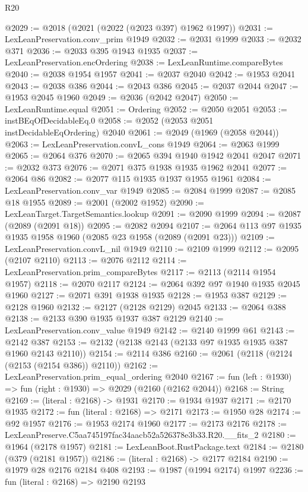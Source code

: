 \begin{lexlean}{R20}
\begin{coremodule}
@2029 := @2018 (@2021 (@2022 (@2023 @397) @1962 @1997))
@2031 := LexLeanPreservation.conv_prim @1949
@2032 := @2031 @1999
@2033 := @2032 @371
@2036 := @2033 @395 @1943 @1935
@2037 := LexLeanPreservation.encOrdering
@2038 := LexLeanRuntime.compareBytes
@2040 := @2038 @1954 @1957
@2041 := @2037 @2040
@2042 := @1953 @2041
@2043 := @2038 @386
@2044 := @2043 @386
@2045 := @2037 @2044
@2047 := @1953 @2045 @1960
@2049 := @2036 (@2042 @2047)
@2050 := LexLeanRuntime.equal
@2051 := Ordering
@2052 := @2050 @2051
@2053 := instBEqOfDecidableEq.{0}
@2058 := @2052 (@2053 @2051 instDecidableEqOrdering) @2040
@2061 := @2049 (@1969 (@2058 @2044))
@2063 := LexLeanPreservation.convL_cons @1949
@2064 := @2063 @1999
@2065 := @2064 @376
@2070 := @2065 @394 @1940 @1942 @2041 @2047
@2071 := @2032 @373
@2076 := @2071 @375 @1938 @1935 @1962 @2041
@2077 := @2064 @86
@2082 := @2077 @115 @1935 @1937 @1955 @1961
@2084 := LexLeanPreservation.conv_var @1949
@2085 := @2084 @1999
@2087 := @2085 @18 @1955
@2089 := @2001 (@2002 @1952)
@2090 := LexLeanTarget.TargetSemantics.lookup
@2091 := @2090 @1999
@2094 := @2087 (@2089 (@2091 @18))
@2095 := @2082 @2094
@2107 := @2064 @113 @97 @1935 @1935 @1958 @1960 (@2085 @23 @1958 (@2089 (@2091 @23)))
@2109 := LexLeanPreservation.convL_nil @1949
@2110 := @2109 @1999
@2112 := @2095 (@2107 @2110)
@2113 := @2076 @2112
@2114 := LexLeanPreservation.prim_compareBytes
@2117 := @2113 (@2114 @1954 @1957)
@2118 := @2070 @2117
@2124 := @2064 @392 @97 @1940 @1935 @2045 @1960
@2127 := @2071 @391 @1938 @1935
@2128 := @1953 @387
@2129 := @2128 @1960
@2132 := @2127 (@2128 @2129) @2045
@2133 := @2064 @388
@2138 := @2133 @390 @1935 @1937 @387 @2129
@2140 := LexLeanPreservation.conv_value @1949
@2142 := @2140 @1999 @61
@2143 := @2142 @387
@2153 := @2132 (@2138 @2143 (@2133 @97 @1935 @1935 @387 @1960 @2143 @2110))
@2154 := @2114 @386
@2160 := @2061 (@2118 (@2124 (@2153 (@2154 @386)) @2110))
@2162 := LexLeanPreservation.prim_equal_ordering @2040
@2167 := fun (left : @1930) => fun (right : @1930) => @2029 (@2160 (@2162 @2044))
@2168 := String
@2169 := (literal : @2168) -> @1931
@2170 := @1934 @1937
@2171 := @2170 @1935
@2172 := fun (literal : @2168) => @2171
@2173 := @1950 @28
@2174 := @92 @1957
@2176 := @1953 @2174 @1960
@2177 := @2173 @2176
@2178 := LexLeanPreserve.C5aa745197fac34aacb52a526378e3b33.R20.__fits_2
@2180 := @1964 (@2178 @1957)
@2181 := LexLeanBoot.RustPackage.text
@2184 := @2180 (@379 (@2181 @1957))
@2186 := (literal : @2168) -> @2177 @2184
@2190 := @1979 @28 @2176 @2184 @408
@2193 := @1987 (@1994 @2174) @1997
@2236 := fun (literal : @2168) =>
  @2190
    @2193

\end{coremodule}
\end{lexlean}
